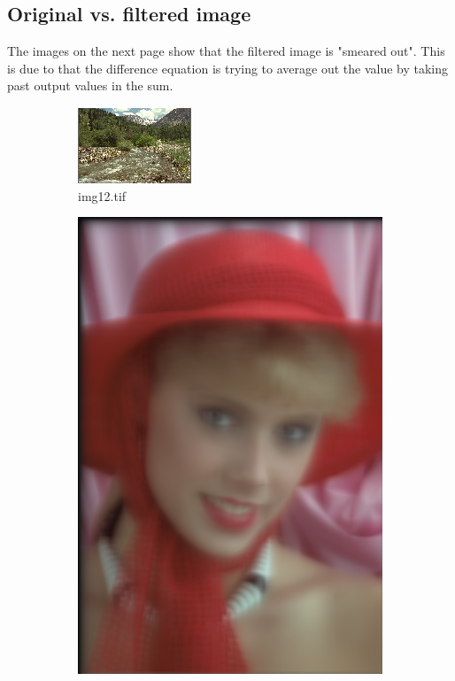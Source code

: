 \documentclass{article}
\begin{document}
\subsection{Original vs. filtered image}
The images on the next page show that the filtered image is "smeared out". This is due to that the difference equation is trying to average out the value by taking past output values in the sum.

\pagebreak

\begin{figure}[ht]
\begin{subfigure}{0.5\textwidth}
\includegraphics[width=0.9\linewidth, left]{img12} 
\caption{img12.tif} 
\end{subfigure}
\begin{subfigure}{0.5\textwidth}
\includegraphics[width=0.9\linewidth, right]{iirf}

\end{subfigure}
\end{figure}
\end{document}
